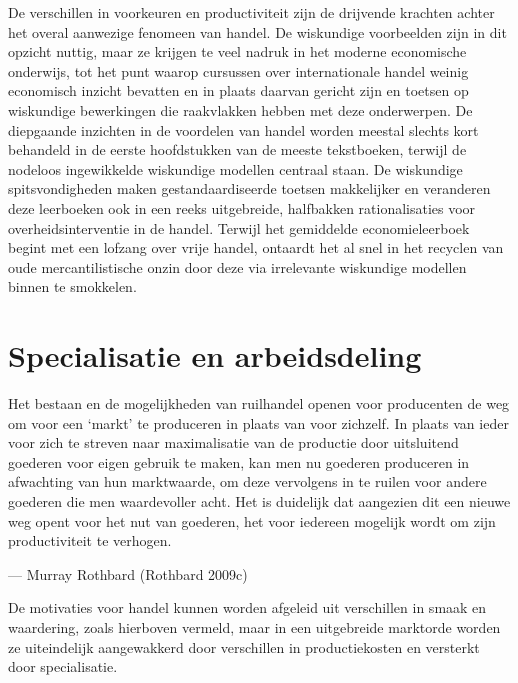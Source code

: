 \documentclass[
  a5paper,
  smalldemyvopaper,11pt,twoside,onecolumn,openright,extrafontsizes,
hidelinks]{memoir}
\begin{document}
De verschillen in voorkeuren en productiviteit zijn de drijvende
krachten achter het overal aanwezige fenomeen van handel. De wiskundige
voorbeelden zijn in dit opzicht nuttig, maar ze krijgen te veel nadruk
in het moderne economische onderwijs, tot het punt waarop cursussen over
internationale handel weinig economisch inzicht bevatten en in plaats
daarvan gericht zijn en toetsen op wiskundige bewerkingen die
raakvlakken hebben met deze onderwerpen. De diepgaande inzichten in de
voordelen van handel worden meestal slechts kort behandeld in de eerste
hoofdstukken van de meeste tekstboeken, terwijl de nodeloos ingewikkelde
wiskundige modellen centraal staan. De wiskundige spitsvondigheden maken
gestandaardiseerde toetsen makkelijker en veranderen deze leerboeken ook
in een reeks uitgebreide, halfbakken rationalisaties voor
overheidsinterventie in de handel. Terwijl het gemiddelde
economieleerboek begint met een lofzang over vrije handel, ontaardt het
al snel in het recyclen van oude mercantilistische onzin door deze via
irrelevante wiskundige modellen binnen te smokkelen.

\section{Specialisatie en
arbeidsdeling}\label{specialisatie-en-arbeidsdeling}

Het bestaan en de mogelijkheden van ruilhandel openen voor producenten
de weg om voor een `markt' te produceren in plaats van voor zichzelf. In
plaats van ieder voor zich te streven naar maximalisatie van de
productie door uitsluitend goederen voor eigen gebruik te maken, kan men
nu goederen produceren in afwachting van hun marktwaarde, om deze
vervolgens in te ruilen voor andere goederen die men waardevoller acht.
Het is duidelijk dat aangezien dit een nieuwe weg opent voor het nut van
goederen, het voor iedereen mogelijk wordt om zijn productiviteit te
verhogen.

--- Murray Rothbard (Rothbard 2009c)

De motivaties voor handel kunnen worden afgeleid uit verschillen in
smaak en waardering, zoals hierboven vermeld, maar in een uitgebreide
marktorde worden ze uiteindelijk aangewakkerd door verschillen in
productiekosten en versterkt door specialisatie.
\end{document}
